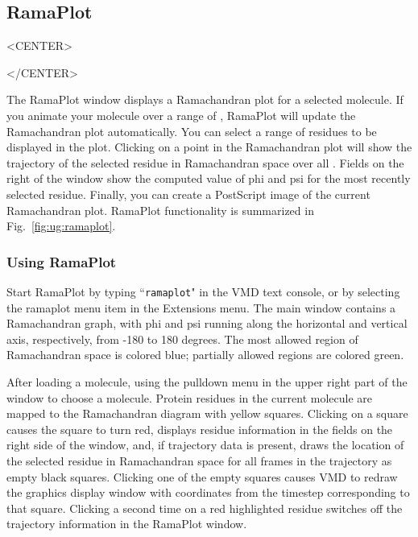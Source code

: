
\subsection{RamaPlot}
\label{ug:ui:window:ramaplot}

\begin{rawhtml}
<CENTER>
\end{rawhtml}
\begin{rawhtml}
</CENTER>
\end{rawhtml}

The RamaPlot window displays a Ramachandran plot for a selected molecule.
If you animate your molecule over a range of \timesteps, RamaPlot will update
the Ramachandran plot automatically.  You can select a range of residues to
be displayed in the plot.  Clicking on a point in the Ramachandran
plot will show the trajectory of the selected residue in Ramachandran space
over all \timesteps.  Fields on the right of the window show the computed
value of phi and psi for the most recently selected residue.  Finally, you can 
create a PostScript image of the current Ramachandran plot.  RamaPlot
functionality is summarized in Fig.~\ref{fig:ug:ramaplot}.

\subsubsection{Using RamaPlot}

Start RamaPlot by typing ``{\tt ramaplot}" in the VMD text console, or by
selecting the {\sf ramaplot} menu item in the {\sf Extensions} menu.  The main
window contains a Ramachandran graph, with phi and psi running along the
horizontal and vertical axis, respectively, from -180 to 180 degrees.  The most
allowed region of Ramachandran space is colored blue; partially allowed regions
are colored green.

After loading a molecule, using the pulldown menu in the upper right part of
the window to choose a molecule.  Protein residues in the current molecule
are mapped to the Ramachandran diagram with yellow squares.  Clicking on a 
square causes the square to turn red, displays residue information in the
fields on the right side of the window, and, if trajectory data is present,
draws the location of the selected residue in Ramachandran space for all 
frames in the trajectory as empty black squares.  Clicking one of the empty
squares causes VMD to redraw the graphics display window with coordinates
from the timestep corresponding to that square.  Clicking a second time
on a red highlighted residue switches off the trajectory information
in the RamaPlot window.

